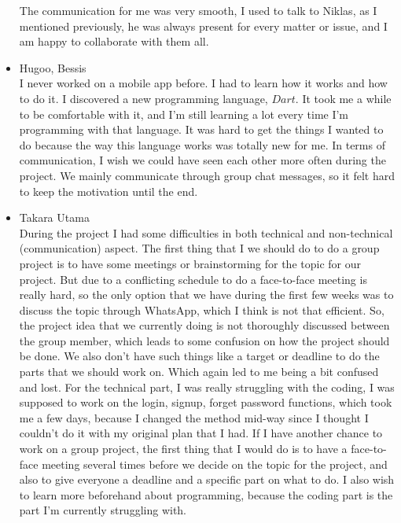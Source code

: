 \documentclass[10pt]{article}
\begin{document}
\begin{multicols*}{2}
\begin{itemize}
  The communication for me was very smooth, I used to talk to Niklas, as I mentioned previously, he was always present for every matter or issue, and I am happy to collaborate with them all. 

  \item {Hugoo, Bessis}\\
  I never worked on a mobile app before. I had to learn how it works and how to do it. I discovered a new programming language, $Dart$. It took me a while to be comfortable with it, and I'm still learning a lot every time I'm programming with that language. It was hard to get the things I wanted to do because the way this language works was totally new for me.
  In terms of communication, I wish we could have seen each other more often during the project. We mainly communicate through group chat messages, so it felt hard to keep the motivation until the end.
  
  \item {Takara Utama}\\
  During the project I had some difficulties in both technical and non-technical (communication) aspect. The first thing that I we should do to do a group project is to have some meetings or brainstorming for the topic for our project. But due to a conflicting schedule to do a face-to-face meeting is really hard, so the only option that we have during the first few weeks was to discuss the topic through WhatsApp, which I think is not that efficient. So, the project idea that we currently doing is not thoroughly discussed between the group member, which leads to some confusion on how the project should be done. We also don’t have such things like a target or deadline to do the parts that we should work on. Which again led to me being a bit confused and lost. For the technical part, I was really struggling with the coding, I was supposed to work on the login, signup, forget password functions, which took me a few days, because I changed the method mid-way since I thought I couldn’t do it with my original plan that I had. If I have another chance to work on a group project, the first thing that I would do is to have a face-to-face meeting several times before we decide on the topic for the project, and also to give everyone a deadline and a specific part on what to do. I also wish to learn more beforehand about programming, because the coding part is the part I'm currently struggling with. 
  

\end{itemize}
\end{multicols*}
\end{document}
